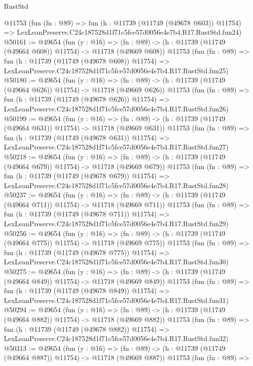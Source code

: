 \begin{lexlean}{RustStd}
\begin{coremodule}
    @11753
    (fun (fn : @89) =>
    fun (h : @11739 (@11749 (@49678 @603)) @11754) =>
    LexLeanPreserve.C24c187528d1f71c5fce57d0056e4e7b4.R17.RustStd.fun24)
@50161 := @49654
    (fun (y : @16) =>
    (fn : @89) -> (h : @11739 (@11749 (@49664 @608)) @11754) -> @11718 (@49669 @608))
    @11753
    (fun (fn : @89) =>
    fun (h : @11739 (@11749 (@49678 @608)) @11754) =>
    LexLeanPreserve.C24c187528d1f71c5fce57d0056e4e7b4.R17.RustStd.fun25)
@50180 := @49654
    (fun (y : @16) =>
    (fn : @89) -> (h : @11739 (@11749 (@49664 @626)) @11754) -> @11718 (@49669 @626))
    @11753
    (fun (fn : @89) =>
    fun (h : @11739 (@11749 (@49678 @626)) @11754) =>
    LexLeanPreserve.C24c187528d1f71c5fce57d0056e4e7b4.R17.RustStd.fun26)
@50199 := @49654
    (fun (y : @16) =>
    (fn : @89) -> (h : @11739 (@11749 (@49664 @631)) @11754) -> @11718 (@49669 @631))
    @11753
    (fun (fn : @89) =>
    fun (h : @11739 (@11749 (@49678 @631)) @11754) =>
    LexLeanPreserve.C24c187528d1f71c5fce57d0056e4e7b4.R17.RustStd.fun27)
@50218 := @49654
    (fun (y : @16) =>
    (fn : @89) -> (h : @11739 (@11749 (@49664 @679)) @11754) -> @11718 (@49669 @679))
    @11753
    (fun (fn : @89) =>
    fun (h : @11739 (@11749 (@49678 @679)) @11754) =>
    LexLeanPreserve.C24c187528d1f71c5fce57d0056e4e7b4.R17.RustStd.fun28)
@50237 := @49654
    (fun (y : @16) =>
    (fn : @89) -> (h : @11739 (@11749 (@49664 @711)) @11754) -> @11718 (@49669 @711))
    @11753
    (fun (fn : @89) =>
    fun (h : @11739 (@11749 (@49678 @711)) @11754) =>
    LexLeanPreserve.C24c187528d1f71c5fce57d0056e4e7b4.R17.RustStd.fun29)
@50256 := @49654
    (fun (y : @16) =>
    (fn : @89) -> (h : @11739 (@11749 (@49664 @775)) @11754) -> @11718 (@49669 @775))
    @11753
    (fun (fn : @89) =>
    fun (h : @11739 (@11749 (@49678 @775)) @11754) =>
    LexLeanPreserve.C24c187528d1f71c5fce57d0056e4e7b4.R17.RustStd.fun30)
@50275 := @49654
    (fun (y : @16) =>
    (fn : @89) -> (h : @11739 (@11749 (@49664 @849)) @11754) -> @11718 (@49669 @849))
    @11753
    (fun (fn : @89) =>
    fun (h : @11739 (@11749 (@49678 @849)) @11754) =>
    LexLeanPreserve.C24c187528d1f71c5fce57d0056e4e7b4.R17.RustStd.fun31)
@50294 := @49654
    (fun (y : @16) =>
    (fn : @89) -> (h : @11739 (@11749 (@49664 @882)) @11754) -> @11718 (@49669 @882))
    @11753
    (fun (fn : @89) =>
    fun (h : @11739 (@11749 (@49678 @882)) @11754) =>
    LexLeanPreserve.C24c187528d1f71c5fce57d0056e4e7b4.R17.RustStd.fun32)
@50313 := @49654
    (fun (y : @16) =>
    (fn : @89) -> (h : @11739 (@11749 (@49664 @887)) @11754) -> @11718 (@49669 @887))
    @11753
    (fun (fn : @89) =>

\end{coremodule}
\end{lexlean}
